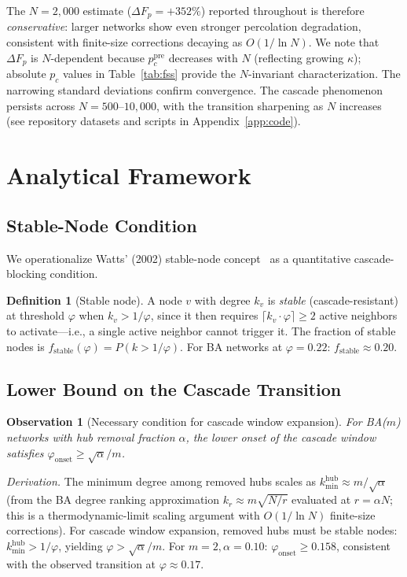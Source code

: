 \documentclass[aps,pre,twocolumn,superscriptaddress,showpacs]{revtex4-2}
\newcommand{\pc}{p_c}
\newcommand{\DF}{\Delta F}
\begin{document}
The $N=2{,}000$ estimate ($\DF_p = +352\%$) reported throughout is therefore \emph{conservative}: larger networks show even stronger percolation degradation, consistent with finite-size corrections decaying as $O(1/\ln N)$. We note that $\DF_p$ is $N$-dependent because $\pc^{\mathrm{pre}}$ decreases with $N$ (reflecting growing $\kappa$); absolute $\pc$ values in Table~\ref{tab:fss} provide the $N$-invariant characterization. The narrowing standard deviations confirm convergence. The cascade phenomenon persists across $N=500$--$10{,}000$, with the transition sharpening as $N$ increases (see repository datasets and scripts in Appendix~\ref{app:code}).

\section{Analytical Framework}
\label{sec:analytical}

\subsection{Stable-Node Condition}

We operationalize Watts' (2002) stable-node concept~\cite{Watts2002} as a quantitative cascade-blocking condition.

\textbf{Definition 1} (Stable node). A node $v$ with degree $k_v$ is \emph{stable} (cascade-resistant) at threshold $\varphi$ when $k_v > 1/\varphi$, since it then requires $\lceil k_v \cdot \varphi \rceil \geq 2$ active neighbors to activate---i.e., a single active neighbor cannot trigger it. The fraction of stable nodes is $f_{\mathrm{stable}}(\varphi) = P(k > 1/\varphi)$. For BA networks at $\varphi=0.22$: $f_{\mathrm{stable}} \approx 0.20$.

\subsection{Lower Bound on the Cascade Transition}

\textbf{Observation 1} (Necessary condition for cascade window expansion). \emph{For BA($m$) networks with hub removal fraction $\alpha$, the lower onset of the cascade window satisfies $\varphi_{\mathrm{onset}} \geq \sqrt{\alpha}/m$.}

\emph{Derivation.} The minimum degree among removed hubs scales as $k_{\min}^{\mathrm{hub}} \approx m/\sqrt{\alpha}$ (from the BA degree ranking approximation $k_r \approx m\sqrt{N/r}$ evaluated at $r = \alpha N$; this is a thermodynamic-limit scaling argument with $O(1/\ln N)$ finite-size corrections). For cascade window expansion, removed hubs must be stable nodes: $k_{\min}^{\mathrm{hub}} > 1/\varphi$, yielding $\varphi > \sqrt{\alpha}/m$. For $m=2, \alpha=0.10$: $\varphi_{\mathrm{onset}} \geq 0.158$, consistent with the observed transition at $\varphi \approx 0.17$.
\end{document}
